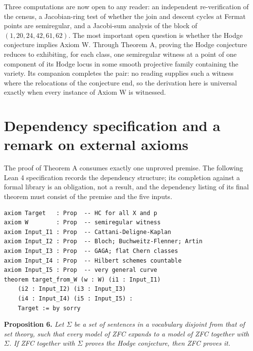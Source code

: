 \documentclass[10pt,twocolumn]{article}
\begin{document}
Three computations are now open to any reader: an independent
re-verification of the census, a Jacobian-ring test of whether the join
and descent cycles at Fermat points are semiregular, and a Jacobi-sum
analysis of the block of \((1,20,24,42,61,62)\). The most important open
question is whether the Hodge conjecture implies Axiom W. Through
Theorem A, proving the Hodge conjecture reduces to exhibiting, for each
class, one semiregular witness at a point of one component of its Hodge
locus in some smooth projective family containing the variety. Its
companion \cite{islam2026term} completes the pair: no reading supplies
such a witness where the relocations of the conjecture end, so the
derivation here is universal exactly when every instance of Axiom W is
witnessed.

\appendix

\hypertarget{dependency-specification-and-a-remark-on-external-axioms}{%
\section{Dependency specification and a remark on external
axioms}\label{dependency-specification-and-a-remark-on-external-axioms}}

The proof of Theorem A consumes exactly one unproved premise. The
following Lean 4 specification records the dependency structure; its
completion against a formal library is an obligation, not a result, and
the dependency listing of its final theorem must consist of the premise
and the five inputs.

\begin{scriptsize}
\begin{verbatim}
axiom Target   : Prop  -- HC for all X and p
axiom W        : Prop  -- semiregular witness
axiom Input_I1 : Prop  -- Cattani-Deligne-Kaplan
axiom Input_I2 : Prop  -- Bloch; Buchweitz-Flenner; Artin
axiom Input_I3 : Prop  -- GAGA; flat Chern classes
axiom Input_I4 : Prop  -- Hilbert schemes countable
axiom Input_I5 : Prop  -- very general curve
theorem target_from_W (w : W) (i1 : Input_I1)
    (i2 : Input_I2) (i3 : Input_I3)
    (i4 : Input_I4) (i5 : Input_I5) :
    Target := by sorry
\end{verbatim}
\end{scriptsize}

\textbf{Proposition 6.} \emph{Let \(\Sigma\) be a set of sentences in a
vocabulary disjoint from that of set theory, such that every model of
ZFC expands to a model of ZFC together with \(\Sigma\). If ZFC together
with \(\Sigma\) proves the Hodge conjecture, then ZFC proves it.}
\end{document}
